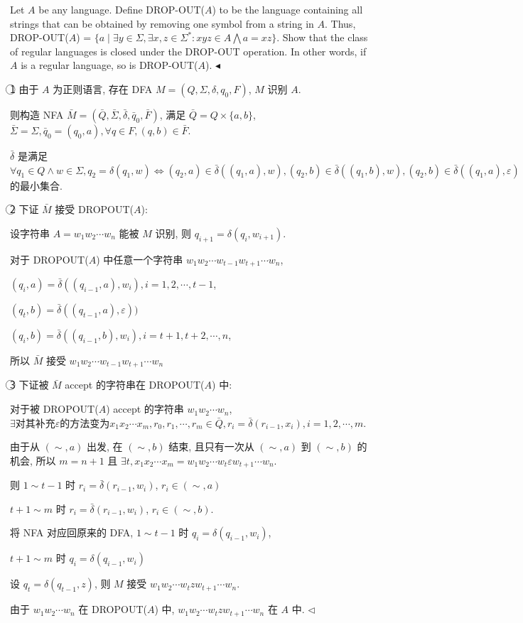 \documentclass[11pt]{article}
\newenvironment{problem}[2][Problem]{\begin{trivlist}
		\item[\hskip \labelsep {\bfseries #1}\hskip \labelsep {\bfseries #2.}]}{\hfill$\blacktriangleleft$\end{trivlist}}
\newenvironment{answer}[1][Answer]{\begin{trivlist}
		\item[\hskip \labelsep {\bfseries #1.}\hskip \labelsep]}{\hfill$\lhd$\end{trivlist}}
\begin{document}
	\begin{problem}{3.(20 points)}
		Let $A$ be any language. Define DROP-OUT($A$) to be the language containing all strings
		that can be obtained by removing one symbol from a string in $A$. Thus, DROP-OUT($A$) = $\{a\mid\exists y \in \Sigma, \exists x, z\in\Sigma^*: xyz\in A\bigwedge a = xz\}$. Show that the class of regular languages is closed under the
		DROP-OUT operation. In other words, if $A$ is a regular language, so is DROP-OUT($A$).
	\end{problem}
	\begin{answer}
		\textcircled{1} 由于 $A$ 为正则语言, 存在 DFA  $M=(Q,\Sigma,\delta,q_0,F)$, $M$ 识别 $A$.
		
		则构造 NFA $\bar{M}=(\bar{Q},\bar{\Sigma},\bar{\delta},\bar{q}_0,\bar{F})$, 满足 $\bar{Q}=Q\times\{a,b\}$, $\bar{\Sigma}=\Sigma,\bar{q}_0=(q_0,a),\forall q\in F,(q,b)\in\bar{F}$.
		
		$\bar{\delta}$ 是满足 $\forall q_1\in Q\wedge w\in\Sigma, q_2=\delta(q_1,w)\Leftrightarrow (q_2,a)\in\bar{\delta}((q_1,a),w),(q_2,b)\in\bar{\delta}((q_1,b),w),(q_2,b)\in\bar{\delta}((q_1,a),\varepsilon)$ 的最小集合.
		
		\textcircled{2} 下证 $\bar{M}$ 接受 DROPOUT($A$):
		
		设字符串 $A=w_1w_2\cdots w_n$ 能被 $M$ 识别, 则 $q_{i+1}=\delta(q_i,w_{i+1})$.
		
		对于 DROPOUT($A$) 中任意一个字符串 $w_1w_2\cdots w_{t-1}w_{t+1}\cdots w_n$, 
		
		$(q_i,a)=\bar\delta((q_{i-1},a),w_i),i=1,2,\cdots,t-1$,
		
		$(q_t,b)=\bar\delta((q_{t-1},a),\varepsilon))$
		
		$(q_i,b)=\bar\delta((q_{i-1},b),w_i),i=t+1,t+2,\cdots,n$,
		
		所以 $\bar{M}$ 接受 $w_1w_2\cdots w_{t-1}w_{t+1}\cdots w_n$
	
		\textcircled{3} 下证被 $\bar{M}$ accept 的字符串在 DROPOUT($A$) 中:
		
		对于被 DROPOUT($A$) accept 的字符串 $w_1w_2\cdots w_n$, $\exists \mbox{对其补充} \varepsilon \mbox{的方法变为}  x_1x_2\cdots x_m, r_0,r_1,\cdots,r_m\in\bar{Q}, r_i=\bar\delta(r_{i-1},x_i),i=1,2,\cdots,m$.
		
		由于从 $(\sim,a)$ 出发, 在 $(\sim,b)$ 结束, 且只有一次从 $(\sim,a)$ 到 $(\sim,b)$ 的机会, 所以 $m=n+1$ 且 $\exists t,x_1x_2\cdots x_m=w_1w_2\cdots w_t\varepsilon w_{t+1}\cdots w_n$.
		
		则 $1\sim t-1$ 时 $r_i=\bar\delta(r_{i-1},w_i)$, $r_i\in(\sim,a)$
		
		$t+1\sim m$ 时 $r_i=\bar\delta(r_{i-1},w_i)$, $r_i\in(\sim,b)$.
		
		将 NFA 对应回原来的 DFA, $1\sim t-1$ 时 $q_i=\delta(q_{i-1},w_i)$, 
		
		$t+1\sim m$ 时 $q_i=\delta(q_{i-1},w_i)$
		
		设 $q_{t}=\delta(q_{t-1},z)$, 则 $M$ 接受 $w_1w_2\cdots w_tzw_{t+1}\cdots w_n$. 
		
		由于 $w_1w_2\cdots w_n$ 在 DROPOUT($A$) 中, $w_1w_2\cdots w_tzw_{t+1}\cdots w_n$ 在 $A$ 中.
	\end{answer}
\end{document}
